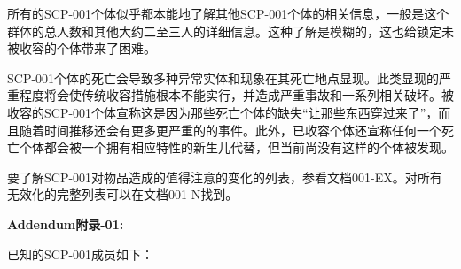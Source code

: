 \documentclass[openany,a4paper]{book} %
\begin{document}
所有的SCP-001个体似乎都本能地了解其他SCP-001个体的相关信息，一般是这个群体的总人数和其他大约二至三人的详细信息。这种了解是模糊的，这也给锁定未被收容的个体带来了困难。\vspace{20pt}

SCP-001个体的死亡会导致多种异常实体和现象在其死亡地点显现。此类显现的严重程度将会使传统收容措施根本不能实行，并造成严重事故和一系列相关破坏。被收容的SCP-001个体宣称这是因为那些死亡个体的缺失“让那些东西穿过来了”，而且随着时间推移还会有更多更严重的的事件。此外，已收容个体还宣称任何一个死亡个体都会被一个拥有相应特性的新生儿代替，但当前尚没有这样的个体被发现。\vspace{20pt}

要了解SCP-001对物品造成的值得注意的变化的列表，参看文档001-EX。对所有无效化的完整列表可以在文档001-N找到。\vspace{12pt}

\textbf{Addendum附录-01:}

已知的SCP-001成员如下：
\end{document}
